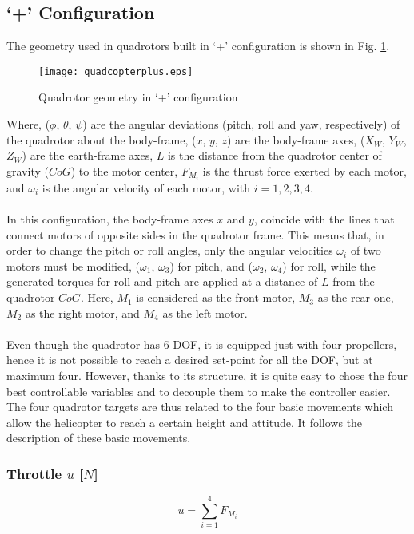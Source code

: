 \subsection{`+' Configuration}
The geometry used in quadrotors built in `+' configuration is shown in Fig. \ref{fig:quadcopterplus}.
\\
\begin{figure}[H]
\begin{center}
  \texttt{[image: quadcopterplus.eps]}
\caption{Quadrotor geometry in `+' configuration} 
    \label{fig:quadcopterplus}
    \end{center}
\end{figure}
Where, ($\phi$, $\theta$, $\psi$) are the angular deviations (pitch, roll and yaw, respectively) of the quadrotor about the body-frame,
 ($x$, $y$, $z$) are the body-frame axes,  ($X_W$, $Y_W$, $Z_W$) are the earth-frame axes, $L$ is the distance from the quadrotor center of gravity ($CoG$) to the motor center, $F_{M_i}$ is the thrust force exerted by each motor, and $\omega_i$ is the angular velocity of each motor, with $i = 1,2,3,4$. 
\\\\
In this configuration, the body-frame axes $x$ and $y$, coincide with the lines that connect motors of opposite sides in the quadrotor frame. This means that, in order to change the pitch or roll angles, only the angular velocities $\omega_i$ of two motors must be modified, ($\omega_1$, $\omega_3$) for pitch,  and ($\omega_2$, $\omega_4$) for roll, while the generated torques for roll and pitch are applied at a distance of $L$ from the quadrotor $CoG$. Here, $M_1$ is considered as the front motor, $M_3$ as the rear one, $M_2$ as the right motor, and $M_4$ as the left motor. 
\\\\
Even though the quadrotor has 6 DOF, it is equipped just with four propellers, hence it is not possible to reach a desired set-point for all the DOF, but at maximum four. However, thanks to its structure, it is quite easy to chose the four best controllable variables and to decouple them to make the controller easier. The four quadrotor targets are thus related to the four basic movements which allow the helicopter to reach a certain height and attitude. It follows the description of these basic movements.


\subsubsection{Throttle $u$ [$N$]}
\begin{equation}
u = \sum_{i=1}^{4}F_{M_i}
\end{equation}

